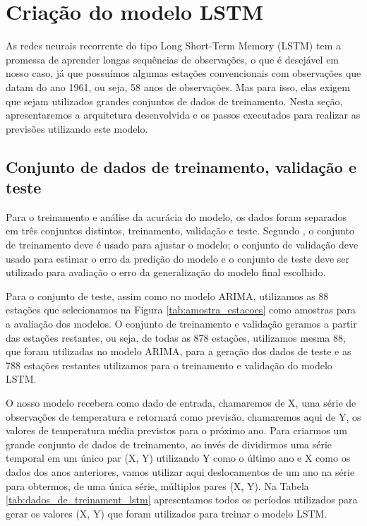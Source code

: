 \section{Criação do modelo LSTM}

As redes neurais recorrente do tipo Long Short-Term Memory (LSTM) tem a promessa de aprender longas sequências de observações, o que é desejável em nosso caso, já que possuímos algumas estações convencionais com observações que datam do ano 1961, ou seja, 58 anos de observações.  Mas para isso, elas exigem que sejam utilizados grandes conjuntos de dados de treinamento. Nesta seção,  apresentaremos a arquitetura desenvolvida e os passos executados para realizar as previsões utilizando este modelo. 

\subsection{Conjunto de dados de treinamento, validação e teste}

Para o treinamento e análise da acurácia do modelo, os dados foram separados em três conjuntos distintos, treinamento, validação e teste. Segundo , o conjunto de treinamento deve é usado para ajustar o modelo; o conjunto de validação deve usado para estimar o erro da predição do modelo e o conjunto de teste deve ser utilizado para avaliação o erro da generalização do modelo final escolhido. 

Para o conjunto de teste, assim como no modelo ARIMA, utilizamos as 88 estações que selecionamos na Figura \ref{tab:amostra_estacoes} como amostras para a avaliação dos modelos. O conjunto de treinamento e validação geramos a partir das estações restantes, ou seja, de todas as 878 estações, utilizamos mesma 88, que foram utilizadas no modelo ARIMA,  para a geração dos dados de teste e as 788 estações restantes utilizamos para o treinamento e validação do modelo LSTM.

O nosso modelo recebera como dado de entrada, chamaremos de X, uma série de observações de temperatura e retornará como previsão, chamaremos aqui de Y, os valores de temperatura média previstos para o próximo ano. Para criarmos um grande conjunto de dados de treinamento, ao invés de dividirmos uma série temporal em um único par (X, Y) utilizando Y como o último ano e X como os dados dos anos anteriores, vamos utilizar aqui deslocamentos de um ano na série para obtermos, de uma única série, múltiplos pares (X, Y). Na Tabela \ref{tab:dados_de_treinament_lstm} apresentamos todos os períodos utilizados para gerar os valores (X, Y) que foram utilizados para treinar o modelo LSTM. 

